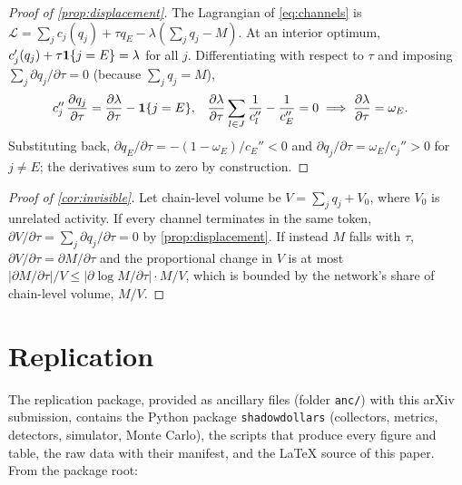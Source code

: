 \begin{proof}[Proof of \cref{prop:displacement}]
The Lagrangian of \cref{eq:channels} is $\mathcal{L}=\sum_jc_j(q_j)+\tau q_E-\lambda\left(\sum_jq_j-M\right)$. At an
interior optimum, $c_j'(q_j)+\tau\mathbf{1}\{j=E\}=\lambda$ for all $j$. Differentiating with respect to $\tau$ and imposing
$\sum_j\partial q_j/\partial\tau=0$ (because $\sum_jq_j=M$),
\begin{align*}
c_j''\,\frac{\partial q_j}{\partial\tau}&=\frac{\partial\lambda}{\partial\tau}-\mathbf{1}\{j=E\},
&
\frac{\partial\lambda}{\partial\tau}\sum_{l\in J}\frac{1}{c_l''}-\frac{1}{c_E''}&=0
\;\Longrightarrow\;\frac{\partial\lambda}{\partial\tau}=\omega_E .
\end{align*}
Substituting back, $\partial q_E/\partial\tau=-(1-\omega_E)/c_E''<0$ and $\partial q_j/\partial\tau=\omega_E/c_j''>0$ for
$j\neq E$; the derivatives sum to zero by construction.
\end{proof}

\begin{proof}[Proof of \cref{cor:invisible}]
Let chain-level volume be $V=\sum_jq_j+V_0$, where $V_0$ is unrelated activity. If every channel terminates in the
same token, $\partial V/\partial\tau=\sum_j\partial q_j/\partial\tau=0$ by \cref{prop:displacement}. If instead $M$
falls with $\tau$, $\partial V/\partial\tau=\partial M/\partial\tau$ and the proportional change in $V$ is at most
$|\partial M/\partial\tau|/V\leq|\partial\log M/\partial\tau|\cdot M/V$, which is bounded by the network's share of
chain-level volume, $M/V$.
\end{proof}

\section{Replication}\label{app:replication}

The replication package, provided as ancillary files (folder \texttt{anc/}) with this arXiv submission, contains the Python package \texttt{shadowdollars} (collectors, metrics, detectors, simulator,
Monte Carlo), the scripts that produce every figure and table, the raw data with their manifest, and the \LaTeX{}
source of this paper. From the package root:

